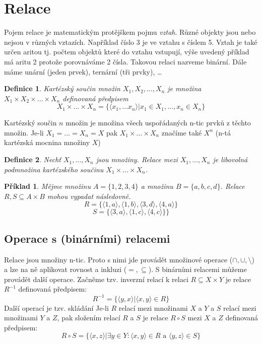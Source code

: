 \documentclass[12pt,a4paper]{article}
\newtheorem{definition}{Definice}
\newtheorem{example}{Příklad}
\begin{document}
\section{Relace}
Pojem relace je matematickým protějškem pojmu \textit{vztah}. Různé objekty jsou nebo nejsou v různých vztazích. Například číslo 3 je ve vztahu  s číslem 5. Vztah je také určen aritou tj. počtem objektů které do vztahu vstupují, výše uvedený příklad má aritu 2 protože porovnáváme 2 čísla. Takovou relaci nazveme binární. Dále máme unární (jeden prvek), ternární (tři prvky), \dots

\begin{definition}
Kartézský součin množin $X_1, X_2, \dots,X_n$ je množina $X_1 \times X_2 \times \dots \times X_n$ definovaná předpisem $$X_1 \times \dots \times X_n =  \{\langle x_1, \dots x_n \rangle | x_1 \in X_1, \dots, x_n \in X_n\} $$
\end{definition}
 Kartézský součin $n$ množin je množina všech uspořádaných n-tic prvků z těchto množin. Je-li $X_1 = \dots = X_n = X$ pak $X_1 \times \dots \times X_n$ značíme také $X^n$ (n-tá kartézská mocnina množiny $X$)

\begin{definition}
Nechť $X_1, \dots,X_n$ jsou množiny. Relace mezi $X_1, \dots,X_n$ je libovolná podmnožina kartézského součinu $X_1 \times \dots \times X_n $.
\end{definition}

\begin{example}
Mějme množinu $A = \{1,2,3,4\}$ a množinu $B = \{a,b,c,d\}$. Relace $R,S \subseteq A \times B$ mohou vypadat následovně. $$R = \{\langle 1, a\rangle, \langle 1, b\rangle, \langle 3, d\rangle, \langle 4, a\rangle\}$$
$$S = \{\langle 3, a\rangle, \langle 1, c\rangle,  \langle 4, c\rangle\}\}$$
\end{example}

\subsection{Operace s (binárními) relacemi}
Relace jsou množiny n-tic. Proto s nimi jde provádět množinové operace ($\cap,\cup,\setminus$) a lze na ně aplikovat rovnost a inkluzi ($=, \subseteq$).
S binárními relacemi můžeme provádět další operace. Začněme tzv. inverzní relací k relaci $R \subseteq X \times Y$ je relace $R^{-1}$ definovaná předpisem: $$R^{-1} = \{\langle y, x \rangle | \langle x, y \rangle \in R\}$$
Další operací je tzv. skládání Je-li $R$ relací mezi množinami $X$ a $Y$ a $S$ relací mezi množinami $Y$ a $Z$, pak složením relací $R$ a $S$ je relace \( R \circ S \) mezi $X$ a $Z$ definovaná předpisem: $$R \circ S = \{\langle x, z \rangle | \exists y \in Y : \langle x,y\rangle \in R \text{ a } \langle y,z \rangle \in S\}$$
\end{document}
